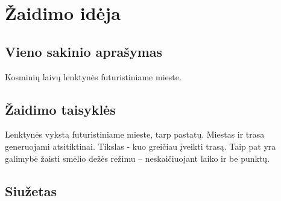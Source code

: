 \section{Žaidimo idėja}
\subsection{Vieno sakinio aprašymas}

Kosminių laivų lenktynės futuristiniame mieste.

\subsection{Žaidimo taisyklės}

Lenktynės vyksta futuristiniame mieste, tarp pastatų.
Miestas ir trasa generuojami atsitiktinai.
Tikslas - kuo greičiau įveikti trasą.
Taip pat yra galimybė žaisti smėlio dežės režimu -- neskaičiuojant laiko ir be punktų.

\subsection{Siužetas}

